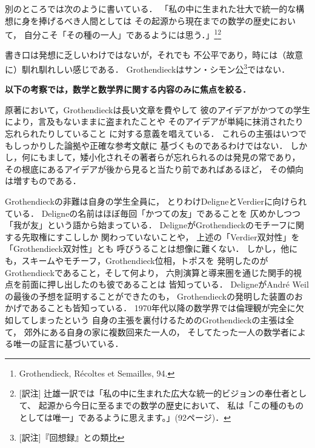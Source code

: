 \documentclass[9pt, a4paper, dvipdfmx]{jlreq}
\theoremstyle{definition}
\theoremstyle{mystyle}
\numberwithin{equation}{section} %
\begin{document}
別のところでは次のように書いている．
「私の中に生まれた壮大で統一的な構想に身を捧げるべき人間としては
その起源から現在までの数学の歴史において，
自分こそ「その種の一人」であるようには思う．」\footnote[20]{
    Grothendieck, R\'ecoltes et Semailles, 94.
}\footnote{
    [訳注]
    辻雄一訳では「私の中に生まれた広大な統一的ビジョンの奉仕者として、
    起源から今日に至るまでの数学の歴史において、
    私は「この種のものとしては唯一」であるように思えます。」(92ページ)．
}


書き口は発想に乏しいわけではないが，それでも
不公平であり，時には（故意に）馴れ馴れしい感じである．
Grothendieckはサン・シモン公\footnote{
    [訳注]『回想録』との類比
}ではない．

\bigskip\begin{center}
    \textbf{以下の考察では，数学と数学界に関する内容のみに焦点を絞る．}
\end{center}\bigskip

原著において，Grothendieckは長い文章を費やして
彼のアイデアがかつての学生により，言及もないままに盗まれたことや
そのアイデアが単純に抹消されたり忘れられたりしていること
に対する意義を唱えている．
これらの主張はいつでもしっかりした論拠や正確な参考文献に
基づくものであるわけではない．
しかし，何にもまして，矮小化されその著者らが忘れられるのは発見の常であり，
その根底にあるアイデアが後から見ると当たり前であればあるほど，
その傾向は増すものである．

Grothendieckの非難は自身の学生全員に，
とりわけDeligneとVerdierに向けられている．
Deligneの名前はほぼ毎回「かつての友」であることを
仄めかしつつ「我が友」という語から始まっている．
DeligneがGrothendieckのモチーフに関する先取権にすこししか
関わっていないことや，
上述の「Verdier双対性」を「Grothendieck双対性」とも
呼びうることは想像に難くない．
しかし，他にも，スキームやモチーフ，Grothendieck位相，トポスを
発明したのがGrothendieckであること，そして何より，
六則演算と導来圏を通じた関手的視点を前面に押し出したのも彼であることは
皆知っている．
DeligneがAndr\'e Weilの最後の予想を証明することができたのも，
Grothendieckの発明した装置のおかげであることも皆知っている．
1970年代以降の数学界では倫理観が完全に欠如してしまったという
自身の主張を裏付けるためのGrothendieckの主張は全て，
郊外にある自身の家に複数回来た一人の，
そしてたった一人の数学者による唯一の証言に基づいている．
\end{document}
